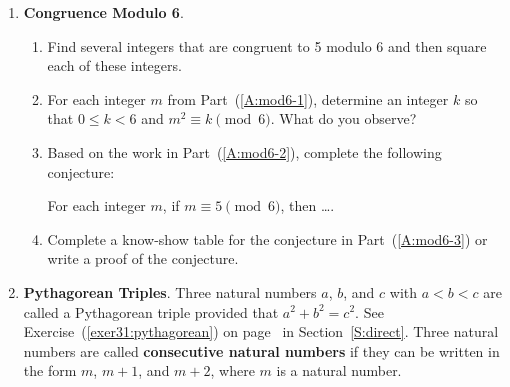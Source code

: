 \begin{enumerate} \setcounter{enumi}{\theoldenumi}
%





  \item \textbf{Congruence Modulo 6}.  \begin{enumerate}
  \item Find several integers that are congruent to 5 modulo 6 and then square each of these integers.
\label{A:mod6-1}%

  \item For each integer  $m$  from Part~(\ref{A:mod6-1}), determine an integer  $k$  so that  $0 \leq k < 6$  and  $m^2  \equiv k \pmod 6$.  What do you observe?
\label{A:mod6-2}%

  \item Based on the work in Part~(\ref{A:mod6-2}), complete the following conjecture: 
\label{A:mod6-3}%

\begin{center}
For each integer $m$, if $m \equiv 5 \pmod 6$, then \ldots .
\end{center}

\item Complete a know-show table for the conjecture in Part~(\ref{A:mod6-3}) or write a proof of the conjecture. 
\end{enumerate}

\item \textbf{Pythagorean Triples}.  Three natural numbers $a$, $b$, and $c$ with $a < b < c$ are called a Pythagorean triple
%
 provided that $a^2 + b^2 = c^2$.  See Exercise~(\ref{exer31:pythagorean}) on page~\pageref{exer31:pythagorean} in Section~\ref{S:direct}.  Three natural numbers are called \textbf{consecutive natural numbers} if they can be written in the form $m$, $m + 1$, and $m + 2$, where $m$ is a natural number.


\end{enumerate}
